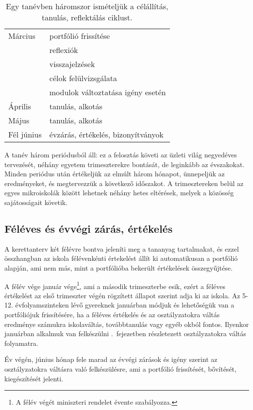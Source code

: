 \begin{table}
\begin{tabular}{ l|l }
    Március          &
    portfólió frissítése                                   \\
                     & reflexiók                           \\
                     & visszajelzések                      \\
                     & célok felülvizsgálata               \\
                     & modulok változtatása igény esetén
    \\ \hline

    Április          &
    tanulás, alkotás
    \\ \hline

    Május            &
    tanulás, alkotás
    \\ \hline

    Fél június       &
    évzárás, értékelés, bizonyítványok
  \end{tabular}
  \caption{Egy tanévben háromszor ismételjük a célállítás, tanulás, reflektálás ciklust.}
  \label{tbl:tanevritmus}
\end{table}

A tanév három periódusból áll: ez a felosztás követi az üzleti világ negyedéves tervezését, néhány egyetem trimeszterekre bontását, de leginkább az évszakokat. Minden periódus után értékeljük az elmúlt három hónapot, ünnepeljük az eredményeket, és megtervezzük a következő időszakot.  A trimesztereken belül az egyes mikroiskolák között lehetnek néhány hetes eltérések, melyek a közösség sajátosságait követik.

\subsection{Féléves és évvégi zárás, értékelés}
\label{sec:feleves_bontas}
A kerettanterv két félévre bontva jeleníti meg a tananyag tartalmakat, és ezzel összhangban az iskola félévenkénti értekelést állít ki automatikusan a portfólió alapján, ami nem más, mint a portfólióba bekerült értékelések összegyűjtése.

A félév vége január vége\footnote{A félév végét miniszteri rendelet évente szabályozza.}, ami a második trimeszterbe esik, ezért a féléves értékelést az első trimeszter végén rögzített állapot szerint adja ki az iskola.  Az 5-12. évfolyamszinteken lévő gyereknek januárban módjuk és lehetőségük van a portfóliójuk frissítésére, ha a féléves értékelés és az osztályzatokra váltás eredménye számukra iskolaváltás, továbbtanulás vagy egyéb okból fontos. Ilyenkor januárban alkalmuk van felkészülni .~fejezetben részletezett osztályzatokra váltás folyamatra.

Év végén, június hónap fele marad az évvégi zárások és igény szerint az osztályzatokra váltásra való felkészülésre, ami a portfólió frissítését, bővítését, kiegészítését jelenti.
